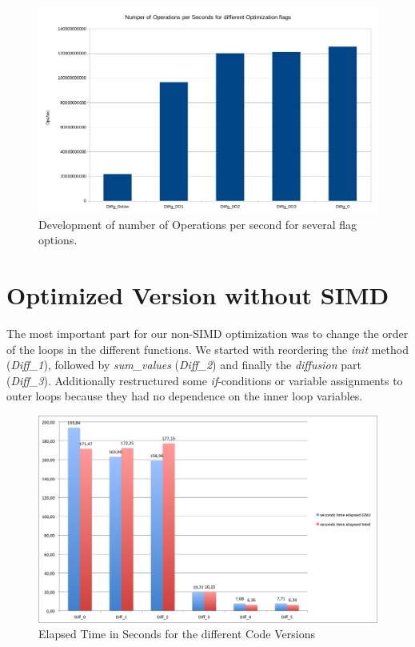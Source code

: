 \documentclass[12pt,a4paper]{article}
\begin{document}
\begin{figure}
	\centering
	\includegraphics[width=1.0\linewidth]{"Benchmark 3/noopssec"}
	\caption{Development of number of Operations per second for several flag options.  }
	\label{fig:noopssec}
\end{figure}

\section{Optimized Version without SIMD}

The most important part for our non-SIMD optimization was to change the order of the loops in the different functions. We started with reordering the \emph{init} method (\emph{Diff\_1}), followed by \emph{sum\_values} (\emph{Diff\_2}) and finally the \emph{diffusion} part (\emph{Diff\_3}). Additionally restructured some \emph{if}-conditions or variable assignments to outer loops because they had no dependence on the inner loop variables.  

 
\begin{figure}
	\centering
	\includegraphics[width=1.0\linewidth]{"Benchmark/seconds"}
	\caption{Elapsed Time in Seconds for the different Code Versions}
	\label{fig:seconds}
\end{figure}
\end{document}
